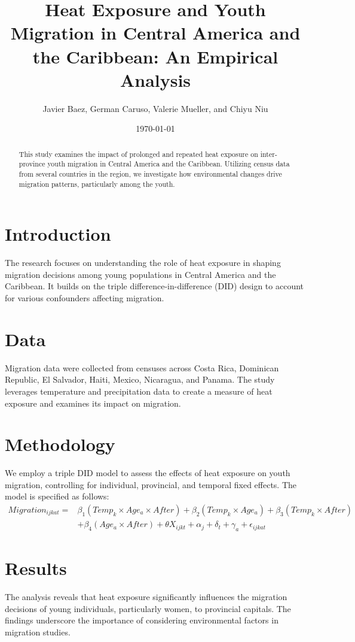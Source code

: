 \documentclass[12pt]{article}
\title{Heat Exposure and Youth Migration in Central America and the Caribbean: An Empirical Analysis}
\author{Javier Baez, German Caruso, Valerie Mueller, and Chiyu Niu}
\date{\today}
\begin{document}
\maketitle

\begin{abstract}
This study examines the impact of prolonged and repeated heat exposure on inter-province youth migration in Central America and the Caribbean. Utilizing census data from several countries in the region, we investigate how environmental changes drive migration patterns, particularly among the youth.
\end{abstract}

\section{Introduction}
The research focuses on understanding the role of heat exposure in shaping migration decisions among young populations in Central America and the Caribbean. It builds on the triple difference-in-difference (DID) design to account for various confounders affecting migration.

\section{Data}
Migration data were collected from censuses across Costa Rica, Dominican Republic, El Salvador, Haiti, Mexico, Nicaragua, and Panama. The study leverages temperature and precipitation data to create a measure of heat exposure and examines its impact on migration.

\section{Methodology}
We employ a triple DID model to assess the effects of heat exposure on youth migration, controlling for individual, provincial, and temporal fixed effects. The model is specified as follows:
\begin{align}
Migration_{ijkat} = & \beta_1 (Temp_k \times Age_a \times After) + \beta_2 (Temp_k \times Age_a) + \beta_3 (Temp_k \times After) \nonumber \\
& + \beta_4 (Age_a \times After) + \theta X_{ijkt} + \alpha_j + \delta_t + \gamma_a + \epsilon_{ijkat}
\end{align}


\section{Results}
The analysis reveals that heat exposure significantly influences the migration decisions of young individuals, particularly women, to provincial capitals. The findings underscore the importance of considering environmental factors in migration studies.
\end{document}
